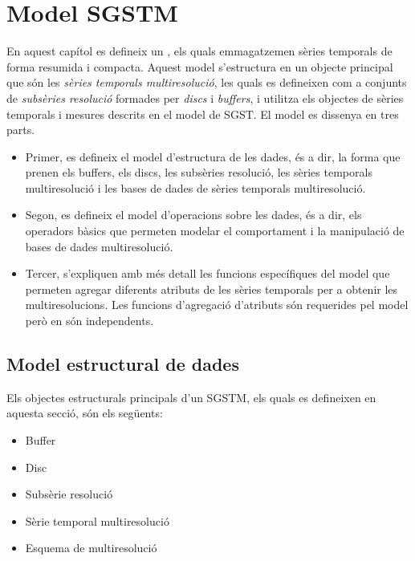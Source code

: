 \chapter{Model SGSTM}
\label{cap:model:sgstm}

En aquest capítol es defineix un , els quals emmagatzemen sèries temporals de forma
resumida i compacta. Aquest model s'estructura en un objecte principal
que són les \emph{sèries temporals multiresolució}, les quals es
defineixen com a conjunts de \emph{subsèries resolució}
formades per \emph{discs} i \emph{buffers}, i utilitza els objectes de
sèries temporals i mesures descrits en el model de \gls{SGST}.  El
model es dissenya en tres parts.

\begin{itemize}
\item Primer, es defineix el model d'estructura de les dades, és a
  dir, la forma que prenen els buffers, els discs, les subsèries
  resolució, les sèries temporals multiresolució i les bases de dades
  de sèries temporals multiresolució.

\item Segon, es defineix el model d'operacions sobre les dades, és a
  dir, els operadors bàsics que permeten modelar el comportament i la
  manipulació de bases de dades multiresolució.

\item Tercer, s'expliquen amb més detall les funcions específiques del
  model que permeten agregar diferents atributs de les sèries
  temporals per a obtenir les multiresolucions. Les funcions
  d'agregació d'atributs són requerides pel model però en són
  independents.
\end{itemize}




\section{Model estructural de dades}


Els objectes estructurals principals d'un \gls{SGSTM}, els quals es
defineixen en aquesta secció, són els següents:
\begin{itemize}
\item Buffer
\item Disc
\item Subsèrie resolució
\item Sèrie temporal multiresolució
\item Esquema de multiresolució
\end{itemize}


